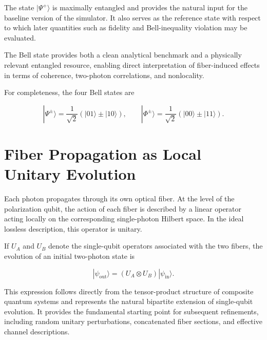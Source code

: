\medskip

The state \( |\Psi^+\rangle \) is maximally entangled and provides the natural input for the baseline version of the simulator. It also serves as the reference state with respect to which later quantities such as fidelity and Bell-inequality violation may be evaluated.

\medskip

The Bell state provides both a clean analytical benchmark and a physically relevant entangled resource, enabling direct interpretation of fiber-induced effects in terms of coherence, two-photon correlations, and nonlocality.

\medskip

For completeness, the four Bell states are

\begin{equation}
|\Psi^{\pm}\rangle
=
\frac{1}{\sqrt{2}}
\left(
|01\rangle \pm |10\rangle
\right),
\qquad
|\Phi^{\pm}\rangle
=
\frac{1}{\sqrt{2}}
\left(
|00\rangle \pm |11\rangle
\right).
\label{eq:bell_state_basis}
\end{equation}


\section{Fiber Propagation as Local Unitary Evolution}

Each photon propagates through its own optical fiber. At the level of the polarization qubit, the action of each fiber is described by a linear operator acting locally on the corresponding single-photon Hilbert space. In the ideal lossless description, this operator is unitary.

\medskip

If \( U_A \) and \( U_B \) denote the single-qubit operators associated with the two fibers, the evolution of an initial two-photon state is

\begin{equation}
|\psi_{\mathrm{out}}\rangle
=
(U_A \otimes U_B)
|\psi_{\mathrm{in}}\rangle.
\label{eq:local_unitary_state_evolution}
\end{equation}

\medskip

This expression follows directly from the tensor-product structure of composite quantum systems and represents the natural bipartite extension of single-qubit evolution. It provides the fundamental starting point for subsequent refinements, including random unitary perturbations, concatenated fiber sections, and effective channel descriptions.

